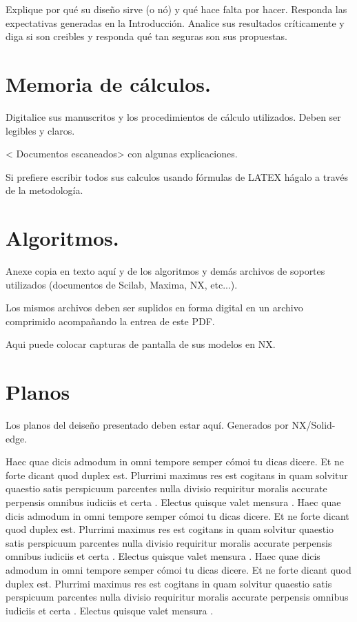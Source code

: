 \documentclass[10pt]{article}
\begin{document}
Explique por qué su diseño sirve (o nó) y qué hace falta por hacer.
Responda las expectativas generadas en la Introducción.
Analice sus resultados críticamente y diga si son creibles y responda
qué tan seguras son sus propuestas. 



 
 

\appendix  
\clearpage %
\addappheadtotoc 
\appendixpage 

\section{Memoria de cálculos.}

Digitalice sus manuscritos y los procedimientos de cálculo utilizados. Deben ser legibles y claros.

< Documentos escaneados> con algunas explicaciones.

Si prefiere escribir todos sus calculos usando fórmulas de LATEX hágalo a través de la metodología.

\section{Algoritmos.}

 Anexe copia en texto aquí y  de los algoritmos y demás archivos de soportes utilizados (documentos de Scilab, Maxima, NX, etc...).
 
 Los mismos archivos deben ser suplidos en forma digital en un archivo comprimido acompañando la entrea de este PDF.
 
 Aqui puede colocar capturas de pantalla de sus modelos en NX. 
 
 
 \section{Planos}
Los planos del deiseño presentado deben estar aquí. Generados por NX/Solid-edge.

Haec quae dicis admodum in omni tempore semper cómoi tu dicas dicere. Et ne forte dicant quod duplex est. Plurrimi maximus res est cogitans in quam solvitur quaestio satis perspicuum parcentes nulla divisio requiritur moralis accurate perpensis omnibus iudiciis et certa . Electus quisque valet mensura .
Haec quae dicis admodum in omni tempore semper cómoi tu dicas dicere. Et ne forte dicant quod duplex est. Plurrimi maximus res est cogitans in quam solvitur quaestio satis perspicuum parcentes nulla divisio requiritur moralis accurate perpensis omnibus iudiciis et certa . Electus quisque valet mensura .
Haec quae dicis admodum in omni tempore semper cómoi tu dicas dicere. Et ne forte dicant quod duplex est. Plurrimi maximus res est cogitans in quam solvitur quaestio satis perspicuum parcentes nulla divisio requiritur moralis accurate perpensis omnibus iudiciis et certa . Electus quisque valet mensura .
\end{document}
